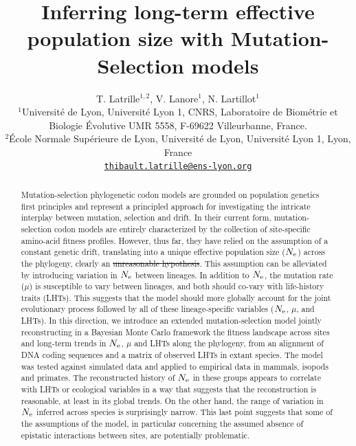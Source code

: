 \documentclass{article}
\title{Inferring long-term effective population size with Mutation-Selection models}
\author{
    \large
    T. {Latrille}$^{1,2}$, V. {Lanore}$^{1}$, N. {Lartillot}$^{1}$ \\
    \normalsize
    $^{1}$Université de Lyon, Université Lyon 1, CNRS, Laboratoire de Biométrie et Biologie Évolutive UMR 5558, F-69622 Villeurbanne, France.\\
    $^{2}$École Normale Supérieure de Lyon, Université de Lyon, Université Lyon 1, Lyon, France\\
    \texttt{\href{mailto:thibault.latrille@ens-lyon.org}{thibault.latrille@ens-lyon.org}} \\
}
\providecommand{\DIFaddtex}[1]{{\protect\color{blue}\uwave{#1}}} %
\providecommand{\DIFdeltex}[1]{{\protect\color{red}\sout{#1}}}                      %
\providecommand{\DIFaddbegin}{} %
\providecommand{\DIFaddend}{} %
\providecommand{\DIFdelbegin}{} %
\providecommand{\DIFdelend}{} %
\providecommand{\DIFadd}[1]{\texorpdfstring{\DIFaddtex{#1}}{#1}} %
\providecommand{\DIFdel}[1]{\texorpdfstring{\DIFdeltex{#1}}{}} %
\begin{document}
    \maketitle

    \begin{abstract}
        Mutation-selection phylogenetic codon models are grounded on population genetics first principles and represent a principled approach for investigating the intricate interplay between mutation, selection and drift.
        In their current form, mutation-selection codon models are entirely characterized by the collection of site-specific amino-acid fitness profiles.
        However, thus far, they have relied on the assumption of a constant genetic drift, translating into a unique effective population size ($N_{\text{e}}$) across the phylogeny, clearly an \DIFdelbegin \DIFdel{unreasonable hypothesis}\DIFdelend \DIFaddbegin \DIFadd{unrealistic assumption}\DIFaddend .
        This assumption can be alleviated by introducing variation in $N_{\text{e}}$ between lineages.
        In addition to $N_{\text{e}}$, the mutation rate ($\mu$) is susceptible to vary between lineages, and both should co-vary with life-history traits (LHTs).
        This suggests that the model should more globally account for the joint evolutionary process followed by all of these lineage-specific variables ($N_{\text{e}}$, $\mu$, and LHTs).
        In this direction, we introduce an extended mutation-selection model jointly reconstructing in a Bayesian Monte Carlo framework the fitness landscape across sites and long-term trends in $N_{\text{e}}$, $\mu$ and LHTs along the phylogeny, from an alignment of DNA coding sequences and a matrix of observed LHTs in extant species.
        The model was tested against simulated data and applied to empirical data in mammals, isopods and primates.
        The reconstructed history of $N_{\text{e}}$ in these groups appears to correlate with LHTs or ecological variables in a way that suggests that the reconstruction is reasonable, at least in its global trends.
        On the other hand, the range of variation in $N_{\text{e}}$ inferred across species is surprisingly narrow.
        This last point suggests that some of the assumptions of the model, in particular concerning the assumed absence of epistatic interactions between sites, are potentially problematic.
    \end{abstract}

\end{document}
